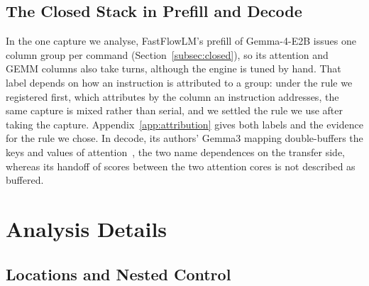 \subsection{The Closed Stack in Prefill and Decode}
\label{app:closed-motivation}

In the one capture we analyse, FastFlowLM's prefill of Gemma-4-E2B issues one column group per command (Section~\ref{subsec:closed}), so its attention and GEMM columns also take turns, although the engine is tuned by hand. That label depends on how an instruction is attributed to a group: under the rule we registered first, which attributes by the column an instruction addresses, the same capture is mixed rather than serial, and we settled the rule we use after taking the capture. Appendix~\ref{app:attribution} gives both labels and the evidence for the rule we chose.
In decode, its authors' Gemma3 mapping double-buffers the keys and values of attention~\citep{du2026gemma3}, the two name dependences on the transfer side, whereas its handoff of scores between the two attention cores is not described as buffered.

\section{Analysis Details}
\label{app:analysis-details}


\subsection{Locations and Nested Control}
\label{app:nested}

